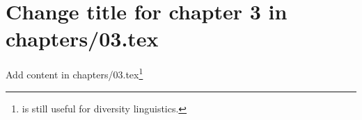 \chapter{Change title for chapter 3 in chapters/03.tex}
Add content in chapters/03.tex\footnote{\citep{Comrie1981} is still useful for diversity linguistics. 
}
